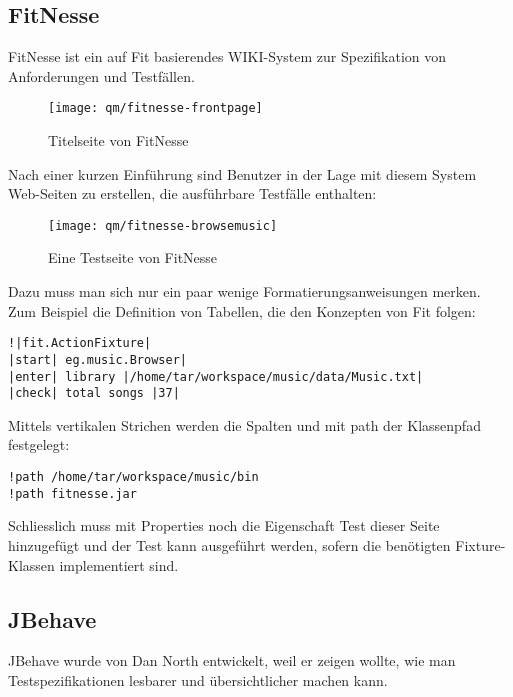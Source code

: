 \subsection{FitNesse}
FitNesse ist ein auf Fit basierendes WIKI-System zur Spezifikation von
Anforderungen und Testfällen.
\begin{figure}[H]
\begin{center}
\texttt{[image: qm/fitnesse-frontpage]}
\caption{Titelseite von FitNesse}
\end{center}
\end{figure}
\newslide
Nach einer kurzen Einführung sind Benutzer in der Lage mit diesem System
Web-Seiten zu erstellen,
die ausführbare Testfälle enthalten:
\begin{figure}[H]
\begin{center}
\texttt{[image: qm/fitnesse-browsemusic]}
\caption{Eine Testseite von FitNesse}
\end{center}
\end{figure}
\newslide
Dazu muss man sich nur ein paar
 wenige Formatierungsanweisungen merken. Zum Beispiel die Definition von
 Tabellen, die den Konzepten von Fit folgen:
\begin{verbatim}
!|fit.ActionFixture|
|start| eg.music.Browser|
|enter| library |/home/tar/workspace/music/data/Music.txt|
|check| total songs |37|
\end{verbatim}
Mittels vertikalen Strichen werden die Spalten und mit path der Klassenpfad
festgelegt:
\begin{verbatim}
!path /home/tar/workspace/music/bin
!path fitnesse.jar
\end{verbatim}
Schliesslich muss mit Properties noch die Eigenschaft Test dieser Seite
hinzugefügt und der Test kann ausgeführt werden, sofern die benötigten
Fixture-Klassen implementiert sind.
%
\newslide
\subsection{JBehave}
JBehave wurde von Dan North entwickelt, weil er zeigen wollte, wie man
Testspezifikationen lesbarer und übersichtlicher machen kann.

